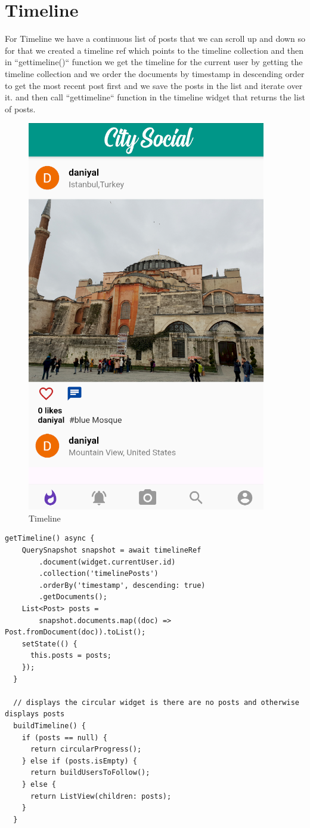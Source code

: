 \section{Timeline}
For Timeline we have a continuous list of posts that we can scroll up and down so for that we created a timeline ref which points to the timeline collection and then in ``gettimeline()`` function we get the timeline for the current user by getting the timeline collection and we order the documents by timestamp in descending order to get the most recent post first and we save the posts in the list and iterate over it. and then call ``gettimeline`` function in the timeline widget that returns the list of posts.
\begin{figure}[!htb]
    \centering
    \includegraphics[scale=0.75]{AppScreenShots/timeline.PNG}
    \caption{Timeline}
    \label{fig:Timeline}
\end{figure}
\begin{verbatim}
getTimeline() async {
    QuerySnapshot snapshot = await timelineRef
        .document(widget.currentUser.id)
        .collection('timelinePosts')
        .orderBy('timestamp', descending: true)
        .getDocuments();
    List<Post> posts =
        snapshot.documents.map((doc) => Post.fromDocument(doc)).toList();
    setState(() {
      this.posts = posts;
    });
  }
  
  // displays the circular widget is there are no posts and otherwise displays posts
  buildTimeline() {
    if (posts == null) {
      return circularProgress();
    } else if (posts.isEmpty) {
      return buildUsersToFollow();
    } else {
      return ListView(children: posts);
    }
  }
\end{verbatim}
